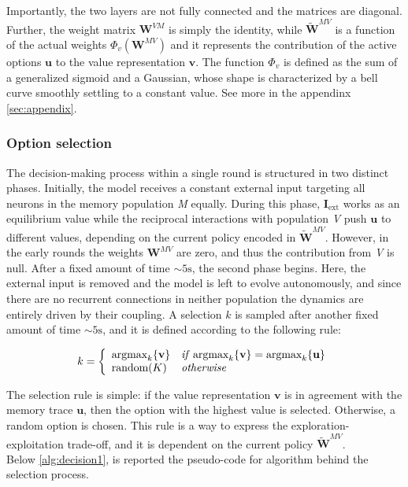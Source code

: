 \noindent Importantly, the two layers are not fully connected and the matrices are diagonal. Further, the weight matrix $\textbf{W}^{VM}$ is simply the identity, while $\tilde{\textbf{W}}^{MV}$ is a function of the actual weights $\Phi_{v}(\textbf{W}^{MV})$ and it represents the contribution of the active options $\textbf{u}$ to the value representation $\textbf{v}$.
The function $\Phi_{v}$ is defined as the sum of a generalized sigmoid and a Gaussian, whose shape is characterized by a bell curve smoothly settling to a constant value. See more in the appendinx \ref{sec:appendix}.

\subsubsection{Option selection}
The decision-making process within a single round is structured in two distinct phases. Initially, the model receives a constant external input targeting all neurons in the memory population \textit{M} equally.
During this phase, $\textbf{I}_{\text{ext}}$ works as an equilibrium value while the reciprocal interactions with population \textit{V} push $\textbf{u}$ to different values, depending on the current policy encoded in $\tilde{\textbf{W}}^{MV}$. However, in the early rounds the weights $\textbf{W}^{MV}$ are zero, and thus
the contribution from \textit{V} is null. After a fixed amount of time $\sim 5 \text{s}$, the second phase begins. Here, the external input is removed and the model is left to evolve autonomously, and since there are no recurrent connections in neither population the dynamics are entirely driven by their coupling. A selection $k$ is sampled after another fixed amount of time $\sim 5 \text{s}$, and it is defined according to the following rule:

\begin{equation*}
    k =
    \left\{
        \begin{array}{ll}
            \text{argmax}_{k}\{\textbf{v}\} & \text{\textit{if}}\; \text{argmax}_{k} \{\textbf{v}\} = \text{argmax}_{k} \{\textbf{u}\} \\
            \text{random}(K) & \text{\textit{otherwise}}
        \end{array}
    \right.
\end{equation*}

\noindent The selection rule is simple: if the value representation $\textbf{v}$ is in agreement with the memory trace $\textbf{u}$, then the option with the highest value is selected. Otherwise, a random option is chosen. This rule is a way to express the exploration-exploitation trade-off, and it
is dependent on the current policy $\tilde{\textbf{W}}^{MV}$. \\ Below \ref{alg:decision1}, is reported the pseudo-code for algorithm behind the selection process.

